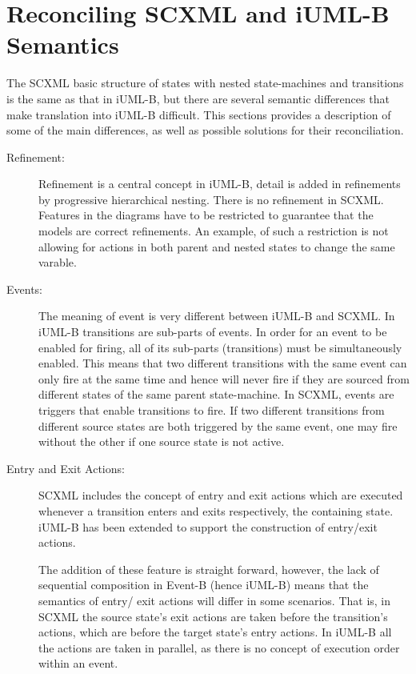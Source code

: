 
\section{Reconciling SCXML and iUML-B Semantics}
\label{sect:recon}

The SCXML basic structure of states with nested 
state-machines and transitions is the same as that 
in iUML-B, but there are several semantic 
differences that make translation into iUML-B difficult. 
This sections provides a description of some of the
main differences, as well as possible solutions for their
reconciliation.

\begin{description}
\item [Refinement:]
Refinement is a central concept in iUML-B, detail is 
added in refinements by progressive hierarchical 
nesting. There is no refinement in SCXML. Features
in the diagrams have to be restricted to guarantee
that the models are correct refinements. An example,
of such a restriction is not allowing for actions in 
both parent and nested states to change the same varable.

\item [Events:]
The meaning of event is very different between iUML-B 
and SCXML. In iUML-B transitions are sub-parts of 
events. In order for an event to be enabled for firing, 
all of its sub-parts (transitions) must be 
simultaneously enabled. This means that two different 
transitions with the same event can only fire at the 
same time and hence will never fire if they are sourced 
from different states of the same parent state-machine. 
In SCXML, events are triggers that enable transitions 
to fire. If two different transitions from different 
source states are both triggered by the same event, one 
may fire without the other if one source state is not 
active.

\item [Entry and Exit Actions:]
SCXML includes the concept of entry and exit actions 
which are executed whenever a transition enters and 
exits respectively, the containing state. 
iUML-B has been extended to support the construction 
of entry/exit actions.

The addition of these feature is straight forward,
however, the lack of sequential composition in 
Event-B (hence iUML-B) means that the semantics of entry/
exit actions will differ in some scenarios. That is, in 
SCXML the source state's exit actions are taken before the 
transition's actions, which are before the target state's 
entry actions. In iUML-B all the actions are taken in 
parallel, as there is no concept of execution order within 
an event. 


\end{description}
